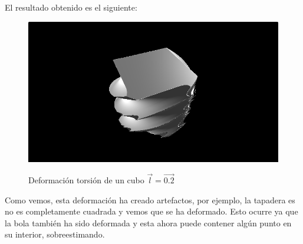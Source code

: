 El resultado obtenido es el siguiente:

\begin{figure}[H]
  \centering
  \captionsetup{justification=centering}%
  \includegraphics[width=1.0\textwidth]{secciones/imagenes/sdf/3d/sdf_twist.png}\label{fig:twist}
  \caption{Deformación torsión de un cubo \(\Vec{l}=\Vec{0.2}\)}
\end{figure}

Como vemos, esta deformación ha creado artefactos, por ejemplo, la tapadera es no es completamente cuadrada y vemos que se ha deformado. Esto ocurre ya que la bola también ha sido deformada y esta ahora puede contener algún punto en su interior, sobreestimando.